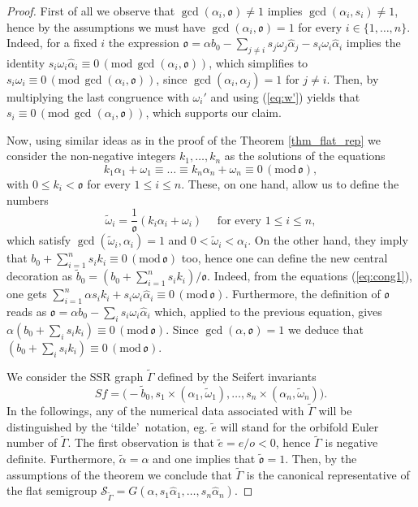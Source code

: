 \documentclass[10pt,a4paper]{amsart}
\newcommand{\G}{\Gamma}
\newcommand{\al}{\alpha}
\newcommand{\calS}{{\mathcal S}}\newcommand{\cals}{{\bf s}}\newcommand{\calst}{{\bf st}}\newcommand{\cS}{{\mathcal S}}
\newcommand{\oo}{\mathfrak{o}}
\newcommand{\w}{\omega}
\begin{document}
 \begin{proof}
 First of all we observe that $\gcd(\al_i,\oo)\neq 1$ implies $\gcd(\al_i,s_i)\neq 1$, hence by the assumptions we must have $\gcd(\al_i,\oo)=1$ for every $i\in\{1,\dots,n\}$. Indeed, for a fixed $i$ the expression $\oo=\al b_0-\sum_{j\neq i}s_j\w_j\widehat{\al}_j - s_i\w_i\widehat{\al}_i$ implies the identity $s_i\w_i\widehat{\al}_i\equiv 0\,(\mathrm{mod }\,{\gcd(\al_i,\oo)})$, which simplifies to $s_i\w_i\equiv 0\,(\mathrm{mod }\,{\gcd(\al_i,\oo)})$, since $\gcd(\al_i,\al_j)=1$ for $j\neq i$. Then, by multiplying the last congruence with $\w_i'$ and using (\ref{eq:w'}) yields that $s_i\equiv 0\,(\mathrm{mod }\,{\gcd(\al_i,\oo)})$, which supports our claim. 
 
 
    Now, using similar ideas as in the proof of the Theorem \ref{thm_flat_rep} we consider the non-negative integers $k_1,\dots,k_n$ as the solutions of the equations
     \begin{equation}\label{eq:cong1}
      k_1 \al_1+\w_1\equiv
     \dots\equiv k_n \al_n+\w_n\equiv 0\,(\mathrm{mod }\,{\oo}),    
     \end{equation}
     with $0\leq k_i< \oo$ for every $1\le i\le n$. 
     These, on one hand, allow us to define the numbers 
     \[
        \tilde{\w}_i=\frac{1}{\oo} (k_i\al_i+\w_i)\quad
        \mbox{ for every }  1\le i\le n,
     \]
     which satisfy $\gcd(\tilde{\w}_i,\al_i)=1$ and $0<\tilde{\w}_i<\al_i$. 
     On the other hand, they imply that $b_0+\sum_{i=1}^ns_ik_i \equiv 0\,(\mathrm{mod }\,{\oo})$ too, hence one can define the new central  decoration as $\tilde{b}_0=(b_0+\sum_{i=1}^ns_ik_i)/\oo$. Indeed, from the equations (\ref{eq:cong1}), one gets $\sum_{i=1}^n\al s_i k_i +s_i\w_i\widehat{\al}_i\equiv 0\,(\mathrm{mod }\,{\oo})$. Furthermore,  the definition of $\oo$ reads as $\oo=\al b_0-\sum_i s_i\w_i\widehat{\al}_i$ which,  applied to the previous equation,  gives $\al(b_0+\sum_i s_i k_i) \equiv 0\,(\mathrm{mod }\,{\oo})$.  Since $\gcd(\al,\oo)=1$ we deduce that  $(b_0+\sum_i s_i k_i) \equiv 0\,(\mathrm{mod }\,{\oo})$.
     
     We consider the SSR graph $\tilde{\G}$ defined by the Seifert invariants
     \[
       Sf=\big(-\tilde{b}_0,s_1\times(\al_1,\tilde{\w}_1),\dots,s_n\times(\al_n,\tilde{\w}_n)
    \big).     
    \]
    In the followings, any of the numerical data associated with $\tilde{\G}$
    will be distinguished by the \textquoteleft tilde\textquoteright\, notation, 
    eg.  $\tilde{e}$ will stand for the orbifold Euler number of $\tilde{\G}$. The first observation is that $\tilde{e}=e/o<0$, hence $\tilde{\G}$ is negative definite. Furthermore, $\tilde{\al}=\al$ and one implies  that  $\tilde{\oo}=1$. Then, by the assumptions of the theorem we conclude that $\tilde{\G}$ is the canonical representative of the flat semigroup $\calS_{\tilde{\Gamma}}=G(\al,s_1 \widehat{\al}_1,\dots, s_n\widehat{\al}_n)$. 
    

\end{proof}
\end{document}
